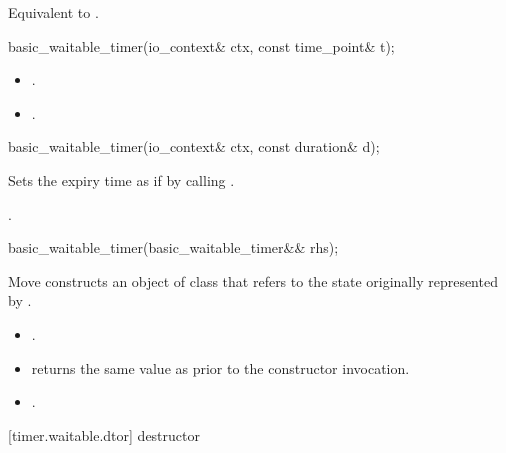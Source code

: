 \begin{itemdescr}
\pnum
\effects Equivalent to .
\end{itemdescr}

\begin{itemdecl}
basic_waitable_timer(io_context& ctx, const time_point& t);
\end{itemdecl}

\begin{itemdescr}
\pnum
\postconditions 
\begin{itemize}
\item
{}.
\item
{}.
\end{itemize}
\end{itemdescr}

\begin{itemdecl}
basic_waitable_timer(io_context& ctx, const duration& d);
\end{itemdecl}

\begin{itemdescr}
\pnum
\effects Sets the expiry time as if by calling .

\pnum
\postconditions {}.
\end{itemdescr}

\begin{itemdecl}
basic_waitable_timer(basic_waitable_timer&& rhs);
\end{itemdecl}

\begin{itemdescr}
\pnum
\effects Move constructs an object of class  that refers to the state originally represented by .

\pnum
\postconditions 
\begin{itemize}
\item
{}.
\item
{} returns the same value as  prior to the constructor invocation.
\item
{}.
\end{itemize}
\end{itemdescr}



[timer.waitable.dtor]{ destructor}

